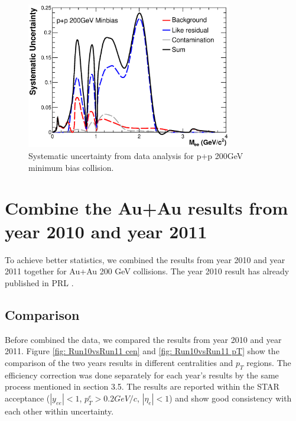 \begin{figure}
\begin{centering}
\includegraphics[width=0.8\textwidth]{fig/3.Analysis/SysUncertainty/sysErr_PP}
\par\end{centering}

\protect\caption{Systematic uncertainty from data analysis for p+p 200GeV minimum bias
collision.}


\label{fig:sys pp}

\end{figure}



\section{Combine the Au+Au results from year 2010 and year 2011}

To achieve better statistics, we combined the results from year 2010
and year 2011 together for Au+Au 200 GeV collisions. The year 2010
result has already published in PRL \cite{PhysRevLett.113.022301}.


\subsection{Comparison }

Before combined the data, we compared the results from year 2010 and
year 2011. Figure \ref{fig: Run10vsRun11 cen} and \ref{fig: Run10vsRun11 pT}
show the comparison of the two years results in different centralities
and $p_{T}$ regions. The efficiency correction was done separately
for each year's results by the same process mentioned in section 3.5.
The results are reported within the STAR acceptance ($|y_{ee}|<1$,
$p_{T}^{e}>0.2GeV/c$, $|\eta_{e}|<1$) and show good consistency
with each other within uncertainty. 

